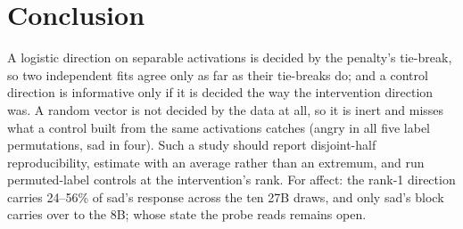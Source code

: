 \documentclass[11pt]{article}
\begin{document}
\section{Conclusion}
A logistic direction on separable activations is decided by the penalty's tie-break, so two independent fits agree only as far as their tie-breaks do; and a control direction is informative only if it is decided the way the intervention direction was. A random vector is not decided by the data at all, so it is inert and misses what a control built from the same activations catches (angry in all five label permutations, sad in four). Such a study should report disjoint-half reproducibility, estimate with an average rather than an extremum, and run permuted-label controls at the intervention's rank. For affect: the rank-1 direction carries 24--56\% of sad's response across the ten 27B draws, and only sad's block carries over to the 8B; whose state the probe reads remains open.

\appendix
\end{document}
